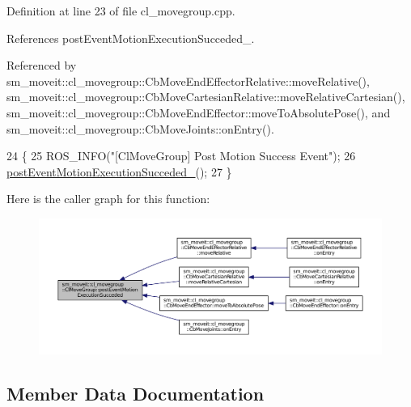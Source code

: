 Definition at line 23 of file cl\+\_\+movegroup.\+cpp.



References post\+Event\+Motion\+Execution\+Succeded\+\_\+.



Referenced by sm\+\_\+moveit\+::cl\+\_\+movegroup\+::\+Cb\+Move\+End\+Effector\+Relative\+::move\+Relative(), sm\+\_\+moveit\+::cl\+\_\+movegroup\+::\+Cb\+Move\+Cartesian\+Relative\+::move\+Relative\+Cartesian(), sm\+\_\+moveit\+::cl\+\_\+movegroup\+::\+Cb\+Move\+End\+Effector\+::move\+To\+Absolute\+Pose(), and sm\+\_\+moveit\+::cl\+\_\+movegroup\+::\+Cb\+Move\+Joints\+::on\+Entry().


\begin{DoxyCode}
24 \{
25     ROS\_INFO(\textcolor{stringliteral}{"[ClMoveGroup] Post Motion Success Event"});
26     \hyperlink{classsm__moveit_1_1cl__movegroup_1_1ClMoveGroup_aad5217efd0061eb0c6dd70550a53bdd2}{postEventMotionExecutionSucceded\_}();
27 \}
\end{DoxyCode}


Here is the caller graph for this function\+:
\nopagebreak
\begin{figure}[H]
\begin{center}
\leavevmode
\includegraphics[width=350pt]{classsm__moveit_1_1cl__movegroup_1_1ClMoveGroup_ab4585dcd850286ed168a25a3ddd56eed_icgraph}
\end{center}
\end{figure}




\subsection{Member Data Documentation}
